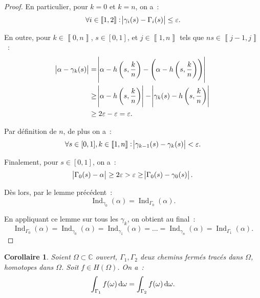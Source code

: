 \documentclass{report}
\newtheorem{cor}[thm]{Corollaire}
\theoremstyle{definition}
\theoremstyle{remark}
\numberwithin{equation}{section}
\newcommand{\C}{\mathbb C}
\DeclareMathOperator{\Ind}{Ind}
\newcommand{\intint}[2]{\left\llbracket#1, #2\right\rrbracket}
\begin{document}
\begin{proof}
			En particulier, pour $k=0$ et $k=n$, on a~:
			\begin{equation}
				\forall i \in \intint 12 : \abs {\gamma_i(s) - \Gamma_i(s)} \leq \varepsilon.
			\end{equation}

			En outre, pour $k \in \intint 0n$, $s \in [0, 1]$, et $j \in \intint 1n$ tels que $ns \in \intint {j-1}j$~:
			\begin{align}
				\abs {\alpha - \gamma_k(s)} &= \abs {\alpha - h\left(s, \frac kn\right) - \left(\alpha - h\left(s, \frac kn\right)\right)} \\
					&\geq \abs {\alpha - h\left(s, \frac kn\right)} - \abs {\gamma_k(s) - h\left(s, \frac kn\right)} \\
					&\geq 2\varepsilon - \varepsilon = \varepsilon.
			\end{align}

			Par définition de $n$, de plus on a~:
			\begin{equation}
				\forall s \in [0, 1], k \in \intint 1n : \abs {\gamma_{k-1}(s)-\gamma_k(s)} < \varepsilon.
			\end{equation}

			Finalement, pour $s \in [0, 1]$, on a~:
			\begin{equation}
				\abs {\Gamma_0(s) - \alpha} \geq 2\varepsilon > \varepsilon \geq \abs {\Gamma_0(s) - \gamma_0(s)}.
			\end{equation}

			Dès lors, par le lemme précédent~:
			\begin{equation}
				\Ind_{\gamma_0}(\alpha) = \Ind_{\Gamma_0}(\alpha).
			\end{equation}

			En appliquant ce lemme sur tous les $\gamma_k$, on obtient au final~:
			\begin{equation}
				\Ind_{\Gamma_0}(\alpha) = \Ind_{\gamma_0}(\alpha) = \Ind_{\gamma_1}(\alpha) = \ldots = \Ind_{\gamma_n}(\alpha) = \Ind_{\Gamma_1}(\alpha).
			\end{equation}
			\end{proof}

			\begin{cor} Soient $\Omega \subset \C$ ouvert, $\Gamma_1, \Gamma_2$ deux chemins fermés tracés dans $\Omega$, homotopes dans $\Omega$. Soit $f \in H(\Omega)$.
			On a~:
			\begin{equation}
				\int_{\Gamma_1}f(\omega)\dif \omega = \int_{\Gamma_2}f(\omega)\dif \omega.
			\end{equation}
			\end{cor}
\end{document}

